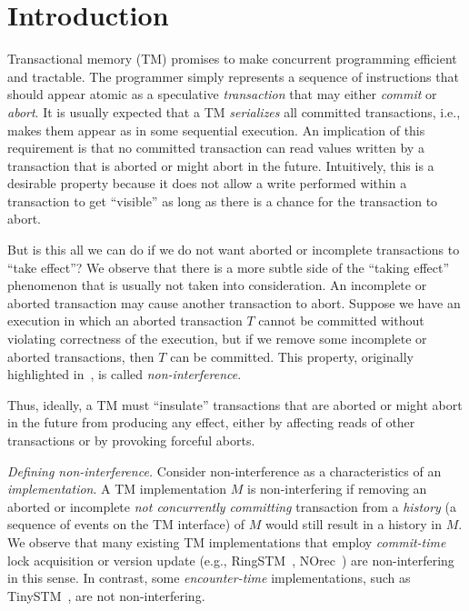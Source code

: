 \documentclass{llncs}
\begin{document}
\section{Introduction}
\label{sec:intro}


Transactional memory (TM) promises to make concurrent programming efficient and tractable. 
The programmer simply represents a sequence of instructions that
should appear atomic as a speculative \emph{transaction} that may
either \emph{commit} or \emph{abort}.  
It is usually expected that a TM \emph{serializes} all committed
transactions, 
i.e., makes them appear as in some sequential execution.
An implication of this requirement 
is that no committed transaction can read values written by 
a transaction that is aborted or might abort in the future. 
Intuitively, this is a desirable property because it does not allow a write performed within a
transaction to get ``visible'' as long as there is a chance for 
the transaction to abort.
   
But is this all we can do if we do not want aborted or incomplete
transactions to ``take effect''? We observe that there is a more
subtle side of the ``taking effect'' phenomenon that is usually not
taken into consideration. 
An incomplete or aborted transaction  may cause another
transaction to abort. 
Suppose we have an execution in which an aborted transaction $T$
cannot be committed without violating correctness of the execution, 
but if we remove some incomplete or aborted transactions, then $T$ can
be 
committed. 
This property, originally highlighted in~\cite{SatVid:2011:ICDCN, SatVid:2012:ICDCN}, is called \emph{non-interference}. 

Thus, ideally, a TM  must ``insulate''  transactions that are aborted or might
abort in the future from producing any effect, either by affecting reads of other transactions 
or by provoking forceful aborts.  

\vspace{1mm}
\noindent
\textit{Defining non-interference.}
Consider non-interference as a characteristics of an
\emph{implementation}.
A TM implementation $M$ is non-interfering if removing an
aborted or incomplete \emph{not concurrently committing} transaction from a 
\emph{history} (a sequence of events on the TM interface) of $M$ would
still result in a history in $M$. 
We observe that many existing TM implementations that 
employ \emph{commit-time} lock acquisition or version update  (e.g., RingSTM~\cite{spear+:spaa:ringstm:2008},
NOrec~\cite{norec}) are non-interfering in this sense. 
In contrast, some \emph{encounter-time} implementations,
such as TinySTM~\cite{tinystm}, are
not non-interfering.   
\end{document}
